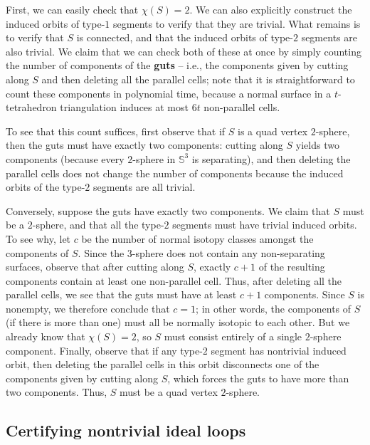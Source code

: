 \documentclass[10pt,a4paper]{amsart}
\begin{document}
First, we can easily check that $\chi(S) = 2$.
We can also explicitly construct the induced orbits of type-$1$ segments to verify that they are trivial.
What remains is to verify that $S$ is connected, and that the induced orbits of type-$2$ segments are also trivial.
We claim that we can check both of these at once by simply counting the number of components of the \textbf{guts} --
i.e., the components given by cutting along $S$ and then deleting all the parallel cells;
note that it is straightforward to count these components in polynomial time, because a normal surface in a $t$-tetrahedron triangulation induces at most $6t$ non-parallel cells.

To see that this count suffices, first observe that if $S$ is a quad vertex $2$-sphere, then the guts must have exactly two components:
cutting along $S$ yields two components (because every $2$-sphere in $\mathbb{S}^3$ is separating), and then deleting the parallel cells does not change
the number of components because the induced orbits of the type-$2$ segments are all trivial.

Conversely, suppose the guts have exactly two components.
We claim that $S$ must be a $2$-sphere, and that all the type-$2$ segments must have trivial induced orbits.
To see why, let $c$ be the number of normal isotopy classes amongst the components of $S$.
Since the $3$-sphere does not contain any non-separating surfaces, observe that after
cutting along $S$, exactly $c+1$ of the resulting components contain at least one non-parallel cell.
Thus, after deleting all the parallel cells, we see that the guts must have at least $c+1$ components.
Since $S$ is nonempty, we therefore conclude that $c=1$;
in other words, the components of $S$ (if there is more than one) must all be normally isotopic to each other.
But we already know that $\chi(S)=2$, so $S$ must consist entirely of a single $2$-sphere component.
Finally, observe that if any type-$2$ segment has nontrivial induced orbit, then deleting the parallel cells in this orbit disconnects one of the components given by cutting along $S$, which forces the guts to have more than two components.
Thus, $S$ must be a quad vertex $2$-sphere.

\subsection{Certifying nontrivial ideal loops}\label{ssec:certifyNontrivial}
\end{document}
